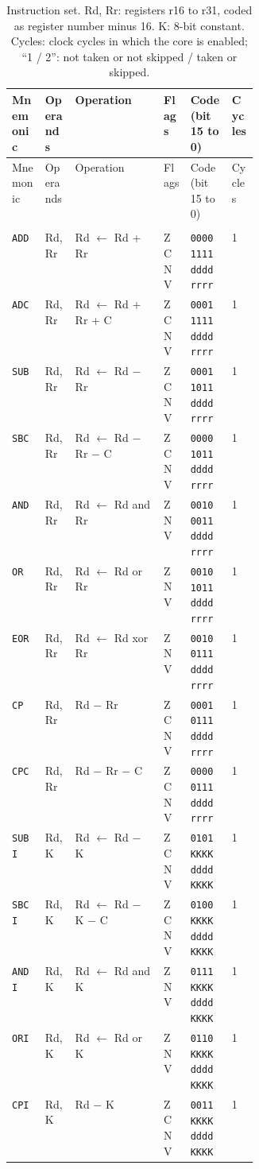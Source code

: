 {\small\begin{longtable}{@{}llp{0.36\linewidth}lll@{}}
\caption{Instruction set. Rd, Rr: registers r16 to r31, coded as register number minus 16. K: 8-bit constant. Cycles: clock cycles in which the core is enabled; ``1 / 2'': not taken or not skipped / taken or skipped.}\label{tab:instr}\\
\toprule
Mnemonic & Operands & Operation & Flags & Code (bit 15 to 0) & Cycles \\
\midrule
\endfirsthead
\toprule
Mnemonic & Operands & Operation & Flags & Code (bit 15 to 0) & Cycles \\
\midrule
\endhead
\bottomrule
\endfoot
\multicolumn{6}{@{}l}{\rule{0pt}{2.6ex}\textbf{Arithmetic and logic}} \\
\texttt{ADD} & Rd, Rr & Rd $\leftarrow$ Rd + Rr & Z C N V & \texttt{0000 1111 dddd rrrr} & 1 \\
\texttt{ADC} & Rd, Rr & Rd $\leftarrow$ Rd + Rr + C & Z C N V & \texttt{0001 1111 dddd rrrr} & 1 \\
\texttt{SUB} & Rd, Rr & Rd $\leftarrow$ Rd $-$ Rr & Z C N V & \texttt{0001 1011 dddd rrrr} & 1 \\
\texttt{SBC} & Rd, Rr & Rd $\leftarrow$ Rd $-$ Rr $-$ C & Z C N V & \texttt{0000 1011 dddd rrrr} & 1 \\
\texttt{AND} & Rd, Rr & Rd $\leftarrow$ Rd and Rr & Z N V & \texttt{0010 0011 dddd rrrr} & 1 \\
\texttt{OR} & Rd, Rr & Rd $\leftarrow$ Rd or Rr & Z N V & \texttt{0010 1011 dddd rrrr} & 1 \\
\texttt{EOR} & Rd, Rr & Rd $\leftarrow$ Rd xor Rr & Z N V & \texttt{0010 0111 dddd rrrr} & 1 \\
\texttt{CP} & Rd, Rr & Rd $-$ Rr & Z C N V & \texttt{0001 0111 dddd rrrr} & 1 \\
\texttt{CPC} & Rd, Rr & Rd $-$ Rr $-$ C & Z C N V & \texttt{0000 0111 dddd rrrr} & 1 \\
\texttt{SUBI} & Rd, K & Rd $\leftarrow$ Rd $-$ K & Z C N V & \texttt{0101 KKKK dddd KKKK} & 1 \\
\texttt{SBCI} & Rd, K & Rd $\leftarrow$ Rd $-$ K $-$ C & Z C N V & \texttt{0100 KKKK dddd KKKK} & 1 \\
\texttt{ANDI} & Rd, K & Rd $\leftarrow$ Rd and K & Z N V & \texttt{0111 KKKK dddd KKKK} & 1 \\
\texttt{ORI} & Rd, K & Rd $\leftarrow$ Rd or K & Z N V & \texttt{0110 KKKK dddd KKKK} & 1 \\
\texttt{CPI} & Rd, K & Rd $-$ K & Z C N V & \texttt{0011 KKKK dddd KKKK} & 1 \\

\end{longtable}}
